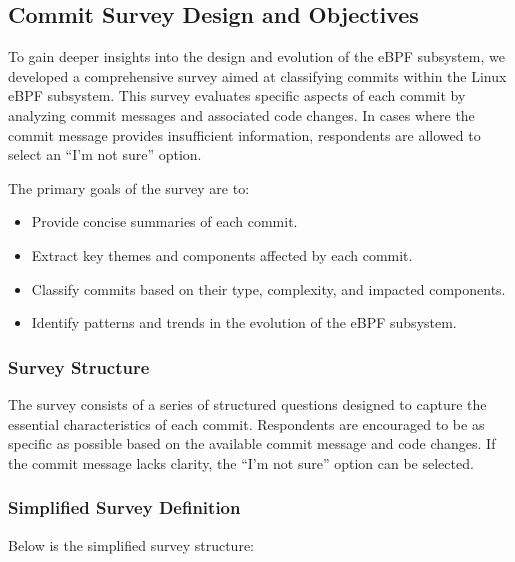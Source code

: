 \subsection{Commit Survey Design and Objectives}

To gain deeper insights into the design and evolution of the eBPF subsystem, we developed a comprehensive survey aimed at classifying commits within the Linux eBPF subsystem. This survey evaluates specific aspects of each commit by analyzing commit messages and associated code changes. In cases where the commit message provides insufficient information, respondents are allowed to select an ``I'm not sure'' option.

The primary goals of the survey are to:

\begin{itemize}
    \item Provide concise summaries of each commit.
    \item Extract key themes and components affected by each commit.
    \item Classify commits based on their type, complexity, and impacted components.
    \item Identify patterns and trends in the evolution of the eBPF subsystem.
\end{itemize}

\subsubsection{Survey Structure}

The survey consists of a series of structured questions designed to capture the essential characteristics of each commit. Respondents are encouraged to be as specific as possible based on the available commit message and code changes. If the commit message lacks clarity, the ``I'm not sure'' option can be selected.

\subsubsection{Simplified Survey Definition}

Below is the simplified survey structure:

